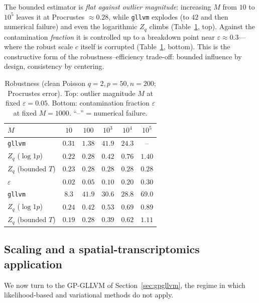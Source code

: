 \documentclass[twoside,11pt]{article}
\begin{document}
The bounded estimator is \emph{flat against outlier magnitude}: increasing $M$ from $10$ to $10^5$ leaves it at Procrustes $\approx 0.28$, while \texttt{gllvm} explodes (to $42$ and then numerical failure) and even the logarithmic $Z_q$ climbs (Table~\ref{tab:robust}, top). Against the contamination \emph{fraction} it is controlled up to a breakdown point near $\varepsilon\approx 0.3$---where the robust scale $c$ itself is corrupted (Table~\ref{tab:robust}, bottom). This is the constructive form of the robustness--efficiency trade-off: bounded influence by design, consistency by centering.

\begin{table}[t]
\centering
\caption{Robustness (clean Poisson $q{=}2,p{=}50,n{=}200$; Procrustes error). Top: outlier magnitude $M$ at fixed $\varepsilon{=}0.05$. Bottom: contamination fraction $\varepsilon$ at fixed $M{=}1000$. ``--'' = numerical failure.}
\label{tab:robust}
\begin{tabular}{lccccc}
\toprule
$M$ & $10$ & $100$ & $10^3$ & $10^4$ & $10^5$\\
\midrule
\texttt{gllvm}                 & $0.31$ & $1.38$ & $41.9$ & $24.3$ & --\\
$Z_q$ ($\log1p$)               & $0.22$ & $0.28$ & $0.42$ & $0.76$ & $1.40$\\
$Z_q$ (bounded $T$)            & $0.23$ & $0.28$ & $0.28$ & $0.28$ & $0.28$\\
\midrule
$\varepsilon$ & $0.02$ & $0.05$ & $0.10$ & $0.20$ & $0.30$\\
\midrule
\texttt{gllvm}                 & $8.3$  & $41.9$ & $30.6$ & $28.8$ & $69.0$\\
$Z_q$ ($\log1p$)               & $0.24$ & $0.42$ & $0.53$ & $0.69$ & $0.89$\\
$Z_q$ (bounded $T$)            & $0.19$ & $0.28$ & $0.39$ & $0.62$ & $1.11$\\
\bottomrule
\end{tabular}
\end{table}

\subsection{Scaling and a spatial-transcriptomics application}
\label{sec:exp-gp}
We now turn to the GP-GLLVM of Section~\ref{sec:gpgllvm}, the regime in which likelihood-based and variational methods do not apply.
\end{document}
